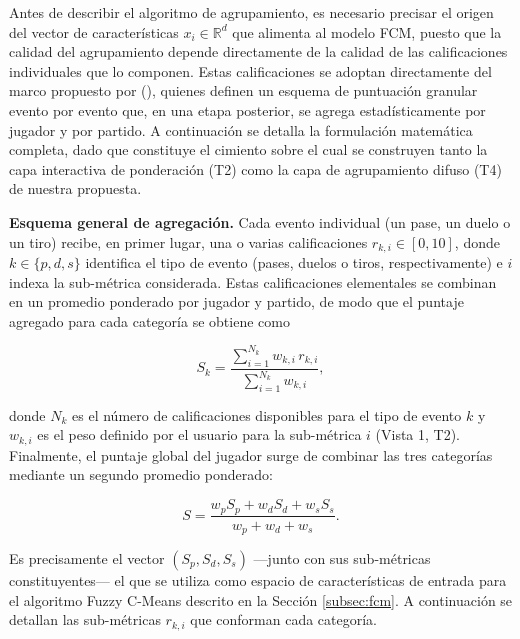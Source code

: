 \documentclass[conference]{IEEEtran}
\begin{document}
Antes de describir el algoritmo de agrupamiento, es necesario precisar el origen del vector de características $x_i \in \mathbb{R}^d$ que alimenta al modelo FCM, puesto que la calidad del agrupamiento depende directamente de la calidad de las calificaciones individuales que lo componen. Estas calificaciones se adoptan directamente del marco propuesto por \citeauthor{evers2024visual} (\citeyear{evers2024visual}), quienes definen un esquema de puntuación granular evento por evento que, en una etapa posterior, se agrega estadísticamente por jugador y por partido. A continuación se detalla la formulación matemática completa, dado que constituye el cimiento sobre el cual se construyen tanto la capa interactiva de ponderación (T2) como la capa de agrupamiento difuso (T4) de nuestra propuesta.

\textbf{Esquema general de agregación.} Cada evento individual (un pase, un duelo o un tiro) recibe, en primer lugar, una o varias calificaciones $r_{k,i} \in [0,10]$, donde $k \in \{p,d,s\}$ identifica el tipo de evento (pases, duelos o tiros, respectivamente) e $i$ indexa la sub-métrica considerada. Estas calificaciones elementales se combinan en un promedio ponderado por jugador y partido, de modo que el puntaje agregado para cada categoría se obtiene como

\begin{equation}
S_k = \frac{\sum_{i=1}^{N_k} w_{k,i}\, r_{k,i}}{\sum_{i=1}^{N_k} w_{k,i}},
\label{eq:Sk}
\end{equation}

donde $N_k$ es el número de calificaciones disponibles para el tipo de evento $k$ y $w_{k,i}$ es el peso definido por el usuario para la sub-métrica $i$ (Vista 1, T2). Finalmente, el puntaje global del jugador surge de combinar las tres categorías mediante un segundo promedio ponderado:

\begin{equation}
S = \frac{w_p S_p + w_d S_d + w_s S_s}{w_p + w_d + w_s}.
\label{eq:Sglobal}
\end{equation}

Es precisamente el vector $(S_p, S_d, S_s)$ —junto con sus sub-métricas constituyentes— el que se utiliza como espacio de características de entrada para el algoritmo Fuzzy C-Means descrito en la Sección \ref{subsec:fcm}. A continuación se detallan las sub-métricas $r_{k,i}$ que conforman cada categoría.
\end{document}
